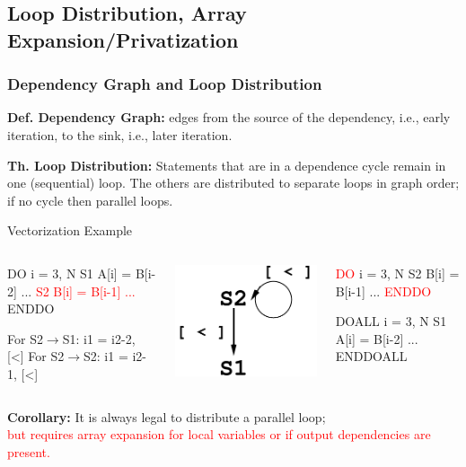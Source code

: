\documentclass{beamer}
\newcommand{\red}[1]{\textcolor{Red}{{#1}}}
\newcommand{\emp}[1]{\textcolor{DikuRed}{ #1}}
\newcommand{\emphh}[1]{\textcolor{CosGreen}{ #1}}
\newcommand{\mymath}[1]{$ #1 $}
\begin{document}
\subsection{Loop Distribution, Array Expansion/Privatization}
\begin{frame}[fragile,t]
  \frametitle{Dependency Graph and Loop Distribution} 

{\bf Def. Dependency Graph:} edges from the source of the dependency, i.e., early iteration, 
to the sink, i.e., later iteration. 

\smallskip

{\bf Th. Loop Distribution:} Statements that are in a dependence cycle remain in one 
(sequential) loop.   The others are distributed to separate loops in graph order; 
if no cycle then parallel loops.\smallskip

\begin{block}{Vectorization Example}
\begin{columns}
\begin{colorcode}[fontsize=\scriptsize]
  DO i = 3, N
\emp{S1  A[i] = B[i-2] ...}
\red{S2  B[i] = B[i-1] ...}
  ENDDO  

For S2\mymath{\rightarrow}S1: i1 = i2-2, \emp{[<]}
For S2\mymath{\rightarrow}S2: i1 = i2-1, \emp{[<]}
\end{colorcode}
\pause
\includegraphics[height=12ex]{img/day2/LoopDistr}  
\begin{colorcode}[fontsize=\scriptsize]
  \red{DO} i = 3, N
S2  B[i] = B[i-1] ...
  \red{ENDDO}

  \emphh{DOALL} i = 3, N
\emp{S1  A[i] = B[i-2] ...}
  \emphh{ENDDOALL}
\end{colorcode}
\end{columns}
\end{block}

\medskip

{\bf Corollary:} It is always legal to distribute a parallel loop;\\
\red{but requires array expansion for local variables or if output
dependencies are present.}
\end{frame}
\end{document}
